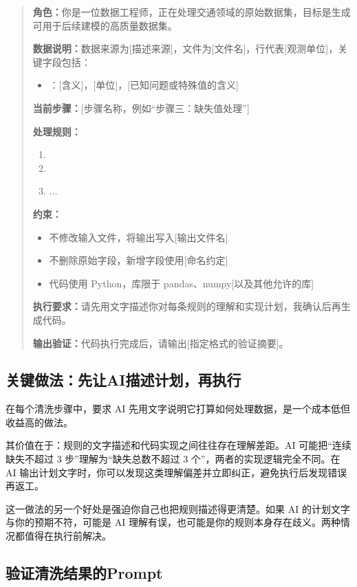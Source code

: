 \begin{quote}
\textbf{角色：}你是一位数据工程师，正在处理交通领域的原始数据集，目标是生成可用于后续建模的高质量数据集。

\textbf{数据说明：}数据来源为[描述来源]，文件为[文件名]，行代表[观测单位]，关键字段包括：

\begin{itemize}
  \item [字段名]：[含义]，[单位]，[已知问题或特殊值的含义]
\end{itemize}

\textbf{当前步骤：}[步骤名称，例如“步骤三：缺失值处理”]

\textbf{处理规则：}
\begin{enumerate}
  \item [规则一]
  \item [规则二]
  \item ...
\end{enumerate}

\textbf{约束：}
\begin{itemize}
  \item 不修改输入文件，将输出写入[输出文件名]
  \item 不删除原始字段，新增字段使用[命名约定]
  \item 代码使用 Python，库限于 pandas、numpy[以及其他允许的库]
\end{itemize}

\textbf{执行要求：}请先用文字描述你对每条规则的理解和实现计划，我确认后再生成代码。

\textbf{输出验证：}代码执行完成后，请输出[指定格式的验证摘要]。
\end{quote}

\subsection{关键做法：先让AI描述计划，再执行}

在每个清洗步骤中，要求 AI 先用文字说明它打算如何处理数据，是一个成本低但收益高的做法。

其价值在于：规则的文字描述和代码实现之间往往存在理解差距。AI 可能把“连续缺失不超过 3 步”理解为“缺失总数不超过 3 个”，两者的实现逻辑完全不同。在 AI 输出计划文字时，你可以发现这类理解偏差并立即纠正，避免执行后发现错误再返工。

这一做法的另一个好处是强迫你自己也把规则描述得更清楚。如果 AI 的计划文字与你的预期不符，可能是 AI 理解有误，也可能是你的规则本身存在歧义。两种情况都值得在执行前解决。

\subsection{验证清洗结果的Prompt}

